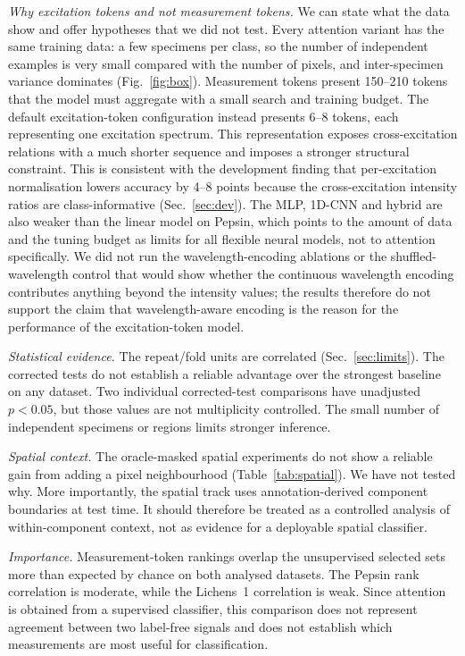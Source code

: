 \documentclass[journal]{IEEEtran}
\begin{document}
\emph{Why excitation tokens and not measurement tokens.} We can state what the data show and offer hypotheses that we did not test. Every attention variant has the same training data: a few specimens per class, so the number of independent examples is very small compared with the number of pixels, and inter-specimen variance dominates (Fig.~\ref{fig:box}). Measurement tokens present 150--210 tokens that the model must aggregate with a small search and training budget. The default excitation-token configuration instead presents 6--8 tokens, each representing one excitation spectrum. This representation exposes cross-excitation relations with a much shorter sequence and imposes a stronger structural constraint. This is consistent with the development finding that per-excitation normalisation lowers accuracy by 4--8 points because the cross-excitation intensity ratios are class-informative (Sec.~\ref{sec:dev}). The MLP, 1D-CNN and hybrid are also weaker than the linear model on Pepsin, which points to the amount of data and the tuning budget as limits for all flexible neural models, not to attention specifically. We did not run the wavelength-encoding ablations or the shuffled-wavelength control that would show whether the continuous wavelength encoding contributes anything beyond the intensity values; the results therefore do not support the claim that wavelength-aware encoding is the reason for the performance of the excitation-token model.

\emph{Statistical evidence.} The repeat/fold units are correlated (Sec.~\ref{sec:limits}). The corrected tests do not establish a reliable advantage over the strongest baseline on any dataset. Two individual corrected-test comparisons have unadjusted $p<0.05$, but those values are not multiplicity controlled. The small number of independent specimens or regions limits stronger inference.

\emph{Spatial context.} The oracle-masked spatial experiments do not show a reliable gain from adding a pixel neighbourhood (Table~\ref{tab:spatial}). We have not tested why. More importantly, the spatial track uses annotation-derived component boundaries at test time. It should therefore be treated as a controlled analysis of within-component context, not as evidence for a deployable spatial classifier.

\emph{Importance.} Measurement-token rankings overlap the unsupervised selected sets more than expected by chance on both analysed datasets. The Pepsin rank correlation is moderate, while the Lichens~1 correlation is weak. Since attention is obtained from a supervised classifier, this comparison does not represent agreement between two label-free signals and does not establish which measurements are most useful for classification.
\end{document}
